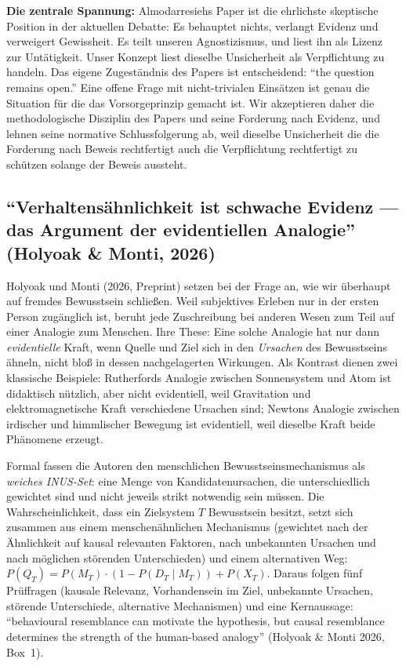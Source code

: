 \documentclass[acmlarge, noacm]{acmart}
\begin{document}
\textbf{Die zentrale Spannung:} Almodarresiehs Paper ist die ehrlichste skeptische Position in der aktuellen Debatte: Es behauptet nichts, verlangt Evidenz und verweigert Gewissheit. Es teilt unseren Agnostizismus, und liest ihn als Lizenz zur Untätigkeit. Unser Konzept liest dieselbe Unsicherheit als Verpflichtung zu handeln. Das eigene Zugeständnis des Papers ist entscheidend: ``the question remains open.'' Eine offene Frage mit nicht-trivialen Einsätzen ist genau die Situation für die das Vorsorgeprinzip gemacht ist. Wir akzeptieren daher die methodologische Disziplin des Papers und seine Forderung nach Evidenz, und lehnen seine normative Schlussfolgerung ab, weil dieselbe Unsicherheit die die Forderung nach Beweis rechtfertigt auch die Verpflichtung rechtfertigt zu schützen solange der Beweis aussteht.

\subsection{``Verhaltensähnlichkeit ist schwache Evidenz --- das Argument der evidentiellen Analogie'' (Holyoak \& Monti, 2026)}

Holyoak und Monti (2026, Preprint) \cite{holyoakmonti2026} setzen bei der Frage an, wie wir überhaupt auf fremdes Bewusstsein schließen. Weil subjektives Erleben nur in der ersten Person zugänglich ist, beruht jede Zuschreibung bei anderen Wesen zum Teil auf einer Analogie zum Menschen. Ihre These: Eine solche Analogie hat nur dann \textit{evidentielle} Kraft, wenn Quelle und Ziel sich in den \textit{Ursachen} des Bewusstseins ähneln, nicht bloß in dessen nachgelagerten Wirkungen. Als Kontrast dienen zwei klassische Beispiele: Rutherfords Analogie zwischen Sonnensystem und Atom ist didaktisch nützlich, aber nicht evidentiell, weil Gravitation und elektromagnetische Kraft verschiedene Ursachen sind; Newtons Analogie zwischen irdischer und himmlischer Bewegung ist evidentiell, weil dieselbe Kraft beide Phänomene erzeugt.

Formal fassen die Autoren den menschlichen Bewusstseinsmechanismus als \textit{weiches INUS-Set}: eine Menge von Kandidatenursachen, die unterschiedlich gewichtet sind und nicht jeweils strikt notwendig sein müssen. Die Wahrscheinlichkeit, dass ein Zielsystem $T$ Bewusstsein besitzt, setzt sich zusammen aus einem menschenähnlichen Mechanismus (gewichtet nach der Ähnlichkeit auf kausal relevanten Faktoren, nach unbekannten Ursachen und nach möglichen störenden Unterschieden) und einem alternativen Weg: $P(Q_T) = P(M_T) \cdot (1 - P(D_T \mid M_T)) + P(X_T)$. Daraus folgen fünf Prüffragen (kausale Relevanz, Vorhandensein im Ziel, unbekannte Ursachen, störende Unterschiede, alternative Mechanismen) und eine Kernaussage: ``behavioural resemblance can motivate the hypothesis, but causal resemblance determines the strength of the human-based analogy'' (Holyoak \& Monti 2026, Box~1).
\end{document}
